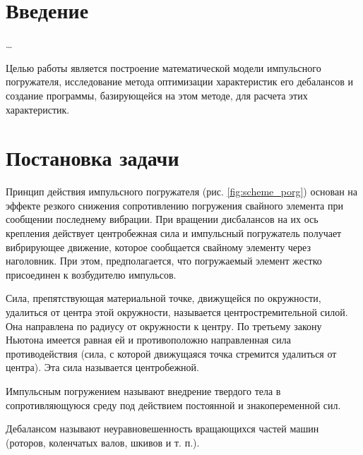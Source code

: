 \section*{Введение}

\dots

Целью работы является построение математической модели импульсного погружателя, исследование метода оптимизации характеристик его дебалансов и создание программы, базирующейся на этом методе, для расчета этих характеристик.


\clearpage
\section{Постановка задачи}

Принцип действия импульсного погружателя (рис. \ref{fig:scheme_porg}) основан на эффекте резкого снижения сопротивлению погружения свайного элемента при сообщении последнему вибрации. При вращении дисбалансов на их ось крепления действует центробежная сила и импульсный погружатель получает вибрирующее движение, которое сообщается свайному элементу через наголовник. При этом, предполагается, что погружаемый элемент жестко присоединен к возбудителю импульсов.

\begin{definition}
    Сила, препятствующая материальной точке, движущейся по окружности, удалиться от центра этой окружности, называется центростремительной силой. Она направлена по радиусу от окружности к центру. По третьему закону Ньютона имеется равная ей и противоположно направленная сила противодействия (сила, с которой движущаяся точка стремится удалиться от центра). Эта сила называется центробежной.
\end{definition}

\begin{definition}
    Импульсным погружением называют внедрение твердого тела в сопротивляющуюся среду под действием постоянной и знакопеременной сил.
\end{definition}


\begin{definition}
    Дебалансом называют неуравновешенность вращающихся частей машин (роторов, коленчатых валов, шкивов и т. п.).
\end{definition}

